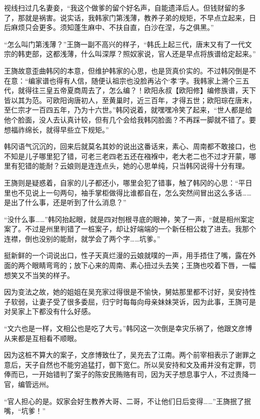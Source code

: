 视线扫过几名妻妾，“我这个做爹的留个好名声，自能遗泽后人。但钱财留的多了，那就是祸害。说实话，我韩家门第浅薄，教养子弟的规矩，不早点立起来，日后麻烦只会更多。须知蓬生麻中、不扶自直，白沙在涅，与之俱黑。”

“怎么叫门第浅薄？”王旖一副不高兴的样子，“韩氏上起三代，唐末又有了一代文宗的韩吏部，这都浅薄，什么叫深厚？照奴家说，官人还是早点将族谱给定起来。”

王旖故意歪曲韩冈的本意，但维护韩家的心思，也是货真价实的。不过韩冈倒是不在意：“编家谱也得有人信，随便认祖宗也没脸再沾个‘孝’字。我韩家上溯个三五代，就得往三皇五帝夏商周去了，怎么编？！欧阳永叔【欧阳修】编修族谱，天下皆以其为范。可欧阳询唐初人，至黄巢时，近三百年，才得五世；欧阳琮在唐末，至仁宗才一百四五年，乃为十六世。”韩冈说着，就嘿嘿冷笑了起来，“世人都是给他个脸面，没人去认真计较，但有几个会给我韩冈脸面？不再踩一脚就不错了。要想福祚绵长，就得早些立下规矩。”

韩冈语气沉沉的，回来后就莫名其妙的说出这番话来，素心、周南都不敢接口，也不知是儿子哪里犯了错，可老三老四老五还在襁褓中，老大老二也不过才开蒙，哪里有犯错的能耐？云娘则是连连点头，她的心思单纯，只当韩冈说得十分有理。

王旖则是疑惑着，自家的儿子都还小，哪里会犯了错事，触了韩冈的心思：“平日里也不见说上一句两句，袖手掌柜做得比谁都自在，怎么突然间冒出这么多话……是出了什么事，还是听到了什么消息？”

“没什么事……”韩冈抬起眼，就是四对刨根寻底的眼神，笑了一声，“就是相州案定案了。不过是州里判错了一桩案子，却让好端端的一个新任相公栽了进去。我那个连襟，倒也没别的能耐，就学会了两个字……坑爹。”

挺新鲜的一个词说出口，性子天真烂漫的云娘就噗的一声，用手捂住了嘴，露在外面的两个眼睛弯弯的；放下心来的周南、素心扭过头去笑；王旖也咬着下唇，一幅想笑又不当笑的样子。

因为变法之故，她的姐姐在吴充家过得很是不愉快，舅姑那里都不讨好，吴安持性子软弱，让妻子受了很多委屈，归宁时每每向母亲妹妹哭诉，因为此事，王旖可是对吴家上下都没有什么好感。

“文六也是一样，文相公也是吃了大亏。”韩冈这一次倒是幸灾乐祸了，他跟文彦博从来都是互相看不顺眼。

因为这桩不算大的案子，文彦博致仕了，吴充去了江南。两个前宰相表示了谢罪之意后，天子自然也不能穷追猛打，御下宽仁。所以吴安持和文及甫并没有定罪，罚俸而已，一开始错判了案子的陈安民贿赂有司，因为天子想息事宁人，不过责降一官，编管远州。

“官人担心的是。奴家会好生教养大哥、二哥，不让他们日后变得……”王旖抿了抿嘴，“坑爹！”


